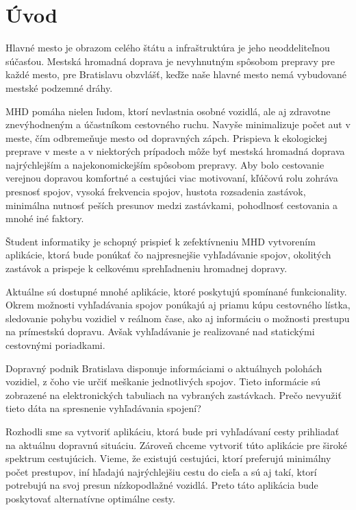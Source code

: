 \chapter*{Úvod} %

Hlavné mesto je obrazom celého štátu a infraštruktúra je jeho neoddeliteľnou súčasťou. Mestská hromadná doprava je nevyhnutným spôsobom prepravy pre každé mesto, pre Bratislavu obzvlášť, keďže naše hlavné mesto nemá vybudované mestské podzemné dráhy.

MHD pomáha nielen ľudom, ktorí nevlastnia osobné vozidlá, ale aj zdravotne znevýhodneným a účastníkom cestovného ruchu. Navyše minimalizuje počet aut v meste, čím odbremeňuje mesto od dopravných zápch. Prispieva k ekologickej preprave v meste a v niektorých prípadoch môže byť mestská hromadná doprava najrýchlejším a najekonomickejším spôsobom prepravy.
Aby bolo cestovanie verejnou dopravou komfortné a cestujúci viac motivovaní, kľúčovú rolu zohráva presnosť spojov, vysoká frekvencia spojov, hustota rozsadenia zastávok, minimálna nutnosť peších presunov medzi zastávkami, pohodlnosť cestovania a mnohé iné faktory. 

Študent informatiky je schopný prispieť k zefektívneniu MHD vytvorením aplikácie, ktorá bude ponúkať čo najpresnejšie vyhľadávanie spojov, okolitých zastávok a prispeje k celkovému sprehľadneniu hromadnej dopravy.

Aktuálne sú dostupné mnohé aplikácie, ktoré poskytujú spomínané funkcionality. Okrem možnosti vyhľadávania spojov ponúkajú aj priamu kúpu cestovného lístka, sledovanie pohybu vozidiel v reálnom čase, ako aj informáciu o možnosti prestupu na prímestskú dopravu. Avšak vyhľadávanie je realizované nad statickými cestovnými poriadkami. 

Dopravný podnik Bratislava disponuje informáciami o aktuálnych polohách vozidiel, z čoho vie určiť meškanie jednotlivých spojov. Tieto informácie sú zobrazené na elektronických tabuliach na vybraných zastávkach. Prečo nevyužiť tieto dáta na spresnenie vyhľadávania spojení?

Rozhodli sme sa vytvoriť aplikáciu, ktorá bude pri vyhľadávaní cesty prihliadať na aktuálnu dopravnú situáciu. Zároveň chceme vytvoriť túto aplikácie pre široké spektrum cestujúcich. Vieme, že existujú cestujúci, ktorí preferujú minimálny počet prestupov, iní hľadajú najrýchlejšiu cestu do cieľa a sú aj takí, ktorí potrebujú na svoj presun nízkopodlažné vozidlá. Preto táto aplikácia bude poskytovať alternatívne optimálne cesty.


 
